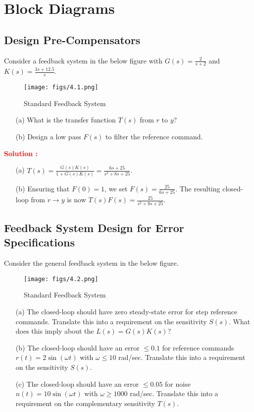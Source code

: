 \documentclass[12pt]{article}
\begin{document}
\clearpage
\section{Block Diagrams}
\subsection{Design Pre-Compensators}

Consider a feedback system in the below figure with $G(s) = \frac{2}{s+2}$ and $K(s) = \frac{3s + 12.5}{s}$.
\begin{figure}[h]
    \centering
    \texttt{[image: figs/4.1.png]}
    \caption{Standard Feedback System}
    \label{fig:4.1}
\end{figure}
\begin{itemize}
    \item[(a)]  What is the transfer function $T(s)$ from $r$ to $y$?
    \item[(b)] Design a low pass $F(s)$ to filter the reference command.
\end{itemize}

\textbf{\textcolor{red}{Solution :}}

\begin{itemize}
    \item[(a)] $T(s) = \frac{G(s)K(s)}{1+G(s)K(s)} = \frac{6s + 25}{s^2 + 8s + 25}$.
    \item[(b)] Ensuring that $F(0) = 1$, we set $F(s) = \frac{25}{6s+25}$. The resulting closed-loop from $r\rightarrow y$ is now $T(s)F(s) = \frac{25}{s^2+8s+25}$.
\end{itemize}

\clearpage
\subsection{Feedback System Design for Error Specifications}

Consider the general feedback system in the below figure.
\begin{figure}[h]
    \centering
    \texttt{[image: figs/4.2.png]}
    \caption{Standard Feedback System}
    \label{fig:loop_97}
\end{figure}

\begin{itemize}
    \item[(a)] The closed-loop should have zero steady-state error for step reference commands. Translate this into a requirement on the sensitivity $S(s)$. What does this imply about the $L(s)=G(s)K(s)$?
    \item[(b)] The closed-loop should have an error $\leq 0.1$ for reference commands $r(t) = 2\sin(\omega t)$ with $\omega \leq 10$ rad/sec. Translate this into a requirement on the sensitivity $S(s)$.
    \item[(c)] The closed-loop should have an error $\leq 0.05$ for noise $n(t)=10\sin(\omega t)$ with $\omega \geq 1000$ rad/sec. Translate this into a requirement on the complementary sensitivity $T(s)$. 
\end{itemize}
\end{document}
